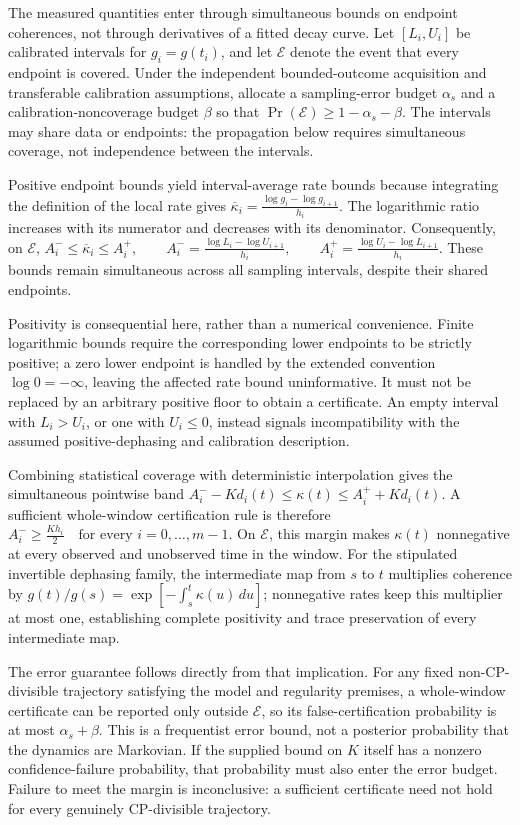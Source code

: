 \documentclass[11pt]{article}
\begin{document}
The measured quantities enter through simultaneous bounds on endpoint coherences, not through derivatives of a fitted decay curve. Let $[L_i,U_i]$ be calibrated intervals for $g_i=g(t_i)$, and let $\mathcal E$ denote the event that every endpoint is covered. Under the independent bounded-outcome acquisition and transferable calibration assumptions, allocate a sampling-error budget $\alpha_s$ and a calibration-noncoverage budget $\beta$ so that $\Pr(\mathcal E)\geq1-\alpha_s-\beta$. The intervals may share data or endpoints: the propagation below requires simultaneous coverage, not independence between the intervals.

Positive endpoint bounds yield interval-average rate bounds because integrating the definition of the local rate gives
$\overline\kappa_i=\frac{\log g_i-\log g_{i+1}}{h_i}.$
The logarithmic ratio increases with its numerator and decreases with its denominator. Consequently, on $\mathcal E$,
$A_i^-\leq\overline\kappa_i\leq A_i^+,\qquad A_i^-=\frac{\log L_i-\log U_{i+1}}{h_i},\qquad A_i^+=\frac{\log U_i-\log L_{i+1}}{h_i}.$
These bounds remain simultaneous across all sampling intervals, despite their shared endpoints.

Positivity is consequential here, rather than a numerical convenience. Finite logarithmic bounds require the corresponding lower endpoints to be strictly positive; a zero lower endpoint is handled by the extended convention $\log0=-\infty$, leaving the affected rate bound uninformative. It must not be replaced by an arbitrary positive floor to obtain a certificate. An empty interval with $L_i>U_i$, or one with $U_i\leq0$, instead signals incompatibility with the assumed positive-dephasing and calibration description.

Combining statistical coverage with deterministic interpolation gives the simultaneous pointwise band
$A_i^- - Kd_i(t)\leq\kappa(t)\leq A_i^+ + Kd_i(t).$
A sufficient whole-window certification rule is therefore
$A_i^-\geq\frac{Kh_i}{2}\quad\text{for every }i=0,\ldots,m-1.$
On $\mathcal E$, this margin makes $\kappa(t)$ nonnegative at every observed and unobserved time in the window. For the stipulated invertible dephasing family, the intermediate map from $s$ to $t$ multiplies coherence by $g(t)/g(s)=\exp[-\int_s^t\kappa(u)\,du]$; nonnegative rates keep this multiplier at most one, establishing complete positivity and trace preservation of every intermediate map.

The error guarantee follows directly from that implication. For any fixed non-CP-divisible trajectory satisfying the model and regularity premises, a whole-window certificate can be reported only outside $\mathcal E$, so its false-certification probability is at most $\alpha_s+\beta$. This is a frequentist error bound, not a posterior probability that the dynamics are Markovian. If the supplied bound on $K$ itself has a nonzero confidence-failure probability, that probability must also enter the error budget. Failure to meet the margin is inconclusive: a sufficient certificate need not hold for every genuinely CP-divisible trajectory.
\end{document}
